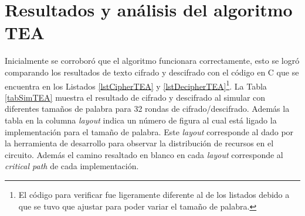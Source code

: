 \section{Resultados y análisis del algoritmo TEA}
Inicialmente se corroboró que el algoritmo funcionara correctamente, esto se logró comparando los resultados de texto cifrado y descifrado con el código en C que se encuentra en los Listados \ref{lstCipherTEA} y \ref{lstDecipherTEA}\footnote{El código para verificar fue ligeramente diferente al de los listados debido a que se tuvo que ajustar para poder variar el tamaño de palabra.}. La Tabla \ref{tabSimTEA} muestra el resultado de cifrado y descifrado al simular con diferentes tamaños de palabra para 32 rondas de cifrado/descifrado. Además la tabla en la columna \textit{layout} indica un número de figura al cual está ligado la implementación para el tamaño de palabra. Este \textit{layout} corresponde al dado por la herramienta de desarrollo para observar la distribución de recursos en el circuito. Además el camino resaltado en blanco en cada \textit{layout} corresponde al \textit{critical path} de cada implementación.

